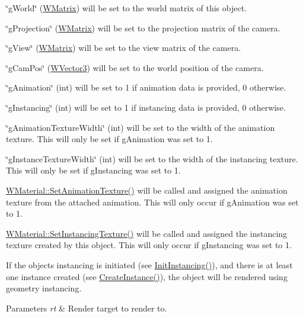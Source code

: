 \begin{DoxyItemize}
\item \char`\"{}g\+World\char`\"{} (\hyperlink{class_w_matrix}{W\+Matrix}) will be set to the world matrix of this object.
\item \char`\"{}g\+Projection\char`\"{} (\hyperlink{class_w_matrix}{W\+Matrix}) will be set to the projection matrix of the camera.
\item \char`\"{}g\+View\char`\"{} (\hyperlink{class_w_matrix}{W\+Matrix}) will be set to the view matrix of the camera.
\item \char`\"{}g\+Cam\+Pos\char`\"{} (\hyperlink{class_w_vector3}{W\+Vector3}) will be set to the world position of the camera.
\item \char`\"{}g\+Animation\char`\"{} (int) will be set to 1 if animation data is provided, 0 otherwise.
\item \char`\"{}g\+Instancing\char`\"{} (int) will be set to 1 if instancing data is provided, 0 otherwise.
\item \char`\"{}g\+Animation\+Texture\+Width\char`\"{} (int) will be set to the width of the animation texture. This will only be set if g\+Animation was set to 1.
\item \char`\"{}g\+Instance\+Texture\+Width\char`\"{} (int) will be set to the width of the instancing texture. This will only be set if g\+Instancing was set to 1.
\item \hyperlink{class_w_material_a02d31133d0c88cd8def56318bb69ff90}{W\+Material\+::\+Set\+Animation\+Texture()} will be called and assigned the animation texture from the attached animation. This will only occur if g\+Animation was set to 1.
\item \hyperlink{class_w_material_ac2ec1357e8a694111bb352711dbfe123}{W\+Material\+::\+Set\+Instancing\+Texture()} will be called and assigned the instancing texture created by this object. This will only occur if g\+Instancing was set to 1.
\end{DoxyItemize}

If the object\textquotesingle{}s instancing is initiated (see \hyperlink{class_w_object_a3eb6c8b80c1cc3ca3149be1647f3abb4}{Init\+Instancing()}), and there is at least one instance created (see \hyperlink{class_w_object_acb0daac5850075a54b012703bab0b589}{Create\+Instance()}), the object will be rendered using geometry instancing.


\begin{DoxyParams}{Parameters}
{\em rt} & Render target to render to. \\
\hline
\end{DoxyParams}
